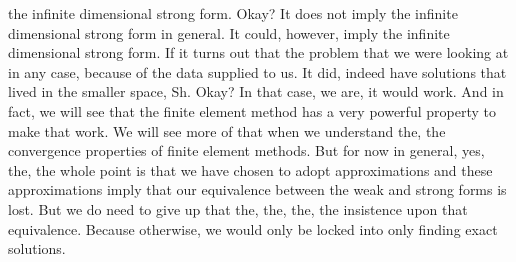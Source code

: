 \documentclass[10pt]{article}
\begin{document}
the infinite dimensional strong form. Okay? It does not imply the infinite dimensional strong form in general. It could, however, imply the infinite dimensional strong form. If it turns out that the problem that we were looking at in any case, because of the data supplied to us. It did, indeed have solutions that lived in the smaller space, Sh. Okay? In that case, we are, it would work. And in fact, we will see that the finite element method has a very powerful property to make that work. We will see more of that when we understand the, the convergence properties of finite element methods. But for now in general, yes, the, the whole point is that we have chosen to adopt approximations and these approximations imply that our equivalence between the weak and strong forms is lost. But we do need to give up that the, the, the, the insistence upon that equivalence. Because otherwise, we would only be locked into only finding exact solutions.
\end{document}
